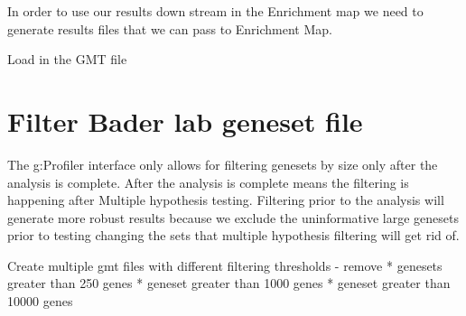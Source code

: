 \documentclass[
]{book}
\begin{document}
In order to use our results down stream in the Enrichment map we need to generate results files that we can pass to Enrichment Map.

Load in the GMT file

\hypertarget{filter-bader-lab-geneset-file}{%
\section{Filter Bader lab geneset file}\label{filter-bader-lab-geneset-file}}

The g:Profiler interface only allows for filtering genesets by size only after the analysis is complete. After the analysis is complete means the filtering is happening after Multiple hypothesis testing. Filtering prior to the analysis will generate more robust results because we exclude the uninformative large genesets prior to testing changing the sets that multiple hypothesis filtering will get rid of.

Create multiple gmt files with different filtering thresholds - remove
* genesets greater than 250 genes
* geneset greater than 1000 genes
* geneset greater than 10000 genes
\end{document}
